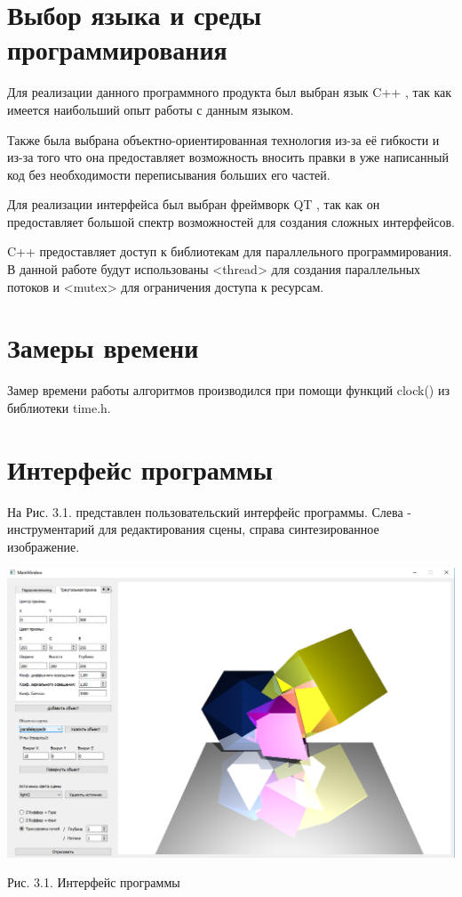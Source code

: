 \documentclass[12pt]{report}
\begin{document}
	\section{Выбор языка и среды программирования}
	
		Для реализации данного программного продукта был выбран язык C++ \cite{7}, так как имеется наибольший опыт работы с данным языком.
		
		Также была выбрана объектно-ориентированная технология из-за её гибкости и из-за того что она предоставляет возможность вносить правки в уже написанный код без необходимости переписывания больших его частей.
		
		Для реализации интерфейса был выбран фреймворк QT \cite{8}, так как он предоставляет большой спектр возможностей для создания сложных интерфейсов.
		
		C++ предоставляет доступ к библиотекам для параллельного программирования. В данной работе будут использованы <thread> \cite{9} для создания параллельных потоков и <mutex> \cite{10} для ограничения доступа к ресурсам.
		
	\section{Замеры времени}
	Замер времени работы алгоритмов производился при помощи функций clock() из библиотеки time.h. \cite{11}
	
	\newpage
	\section{Интерфейс программы}
	
	На Рис. 3.1. представлен пользовательский интерфейс программы. Слева - инструментарий для редактирования сцены, справа синтезированное изображение.
	
	\begin{center}
		\includegraphics[scale=0.45]{UI.png}
		
		Рис. 3.1. Интерфейс программы
	\end{center}	
\end{document}
